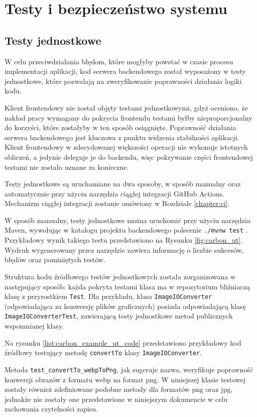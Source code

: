 \chapter{Testy i bezpieczeństwo systemu}
\label{sec:chapter6}

\section{Testy jednostkowe}

W celu przeciwdziałania błędom, które mogłyby powstać w czasie procesu implementacji aplikacji, kod serwera backendowego został wyposażony w testy jednostkowe, które pozwalają na zweryfikowanie poprawności działania logiki kodu.

Klient frontendowy nie został objęty testami jednostkowymi, gdyż oceniono, że nakład pracy wymagany do pokrycia frontendu testami byłby nieproporcjonalny do korzyści, które zostałyby w ten sposób osiągnięte. Poprawność działania serwera backendowego jest kluczowa z punktu widzenia stabilności aplikacji. Klient frontendowy w zdecydowanej większości operacji nie wykonuje istotnych obliczeń, a jedynie deleguje je do backendu, więc pokrywanie części frontendowej testami nie zostało uznane za konieczne.

Testy jednostkowe są uruchamiane na dwa sposoby, w sposób manualny oraz automatycznie przy użyciu narzędzia ciągłej integracji GitHub Actions. Mechanizm ciągłej integracji zostanie omówiony w Rozdziale \ref{chapter:ci}.

W sposób manualny, testy jednostkowe można uruchomić przy użyciu narzędzia Maven, wywołując w katalogu projektu backendowego polecenie \verb|./mvnw test| \cite{maven_guide}. Przykładowy wynik takiego testu przedstawiono na Rysunku \ref{fig:carbon_ut}. Wydruk wygenerowany przez narzędzie zawiera informację o liczbie sukcesów, błędów oraz pominiętych testów.

Struktura kodu źródłowego testów jednostkowych została zorganizowana w następujący sposób: każda pokryta testami klasa ma w repozytorium bliźniaczą klasę z przyrostkiem \verb|Test|. Dla przykładu, klasa \verb|ImageIOConverter| (odpowiadająca za konwersję plików graficznych) posiada odpowiadającą klasę \verb|ImageIOConverterTest|, zawierającą testy jednostkowe metod publicznych wspomnianej klasy.

Na rysunku \ref{list:carbon_example_ut_code} przedstawiono przykładowy kod źródłowy testujący metodę \verb|convertTo| klasy \verb|ImageIOConverter|. 

Metoda \verb|test_convertTo_webpToPng|, jak sugeruje nazwa, weryfikuje poprawność konwersji obrazów z formatu webp na format png. W niniejszej klasie testowej zostały również zdefiniowane podobne metody dla formatów png oraz jpg, jednakże nie zostały one przedstawione w niniejszym dokumencie w celu zachowania czytelności zapisu.

